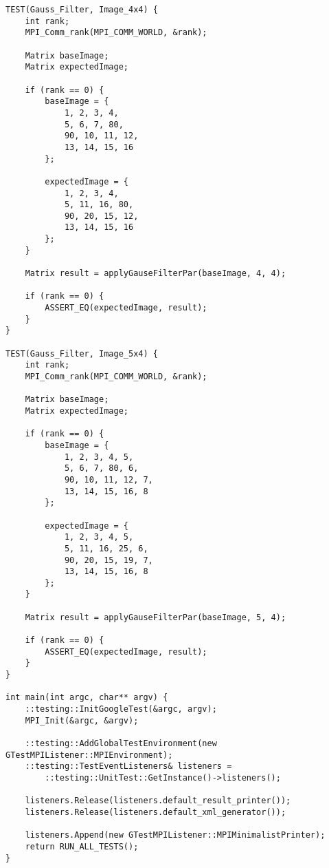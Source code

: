 \documentclass[12pt,a4paper]{article}
\begin{document}
\begin{lstlisting}
TEST(Gauss_Filter, Image_4x4) {
    int rank;
    MPI_Comm_rank(MPI_COMM_WORLD, &rank);

    Matrix baseImage;
    Matrix expectedImage;

    if (rank == 0) {
        baseImage = {
            1, 2, 3, 4,
            5, 6, 7, 80,
            90, 10, 11, 12,
            13, 14, 15, 16
        };

        expectedImage = {
            1, 2, 3, 4,
            5, 11, 16, 80,
            90, 20, 15, 12,
            13, 14, 15, 16
        };
    }

    Matrix result = applyGauseFilterPar(baseImage, 4, 4);

    if (rank == 0) {
        ASSERT_EQ(expectedImage, result);
    }
}

TEST(Gauss_Filter, Image_5x4) {
    int rank;
    MPI_Comm_rank(MPI_COMM_WORLD, &rank);

    Matrix baseImage;
    Matrix expectedImage;

    if (rank == 0) {
        baseImage = {
            1, 2, 3, 4, 5,
            5, 6, 7, 80, 6,
            90, 10, 11, 12, 7,
            13, 14, 15, 16, 8
        };

        expectedImage = {
            1, 2, 3, 4, 5,
            5, 11, 16, 25, 6,
            90, 20, 15, 19, 7,
            13, 14, 15, 16, 8
        };
    }

    Matrix result = applyGauseFilterPar(baseImage, 5, 4);

    if (rank == 0) {
        ASSERT_EQ(expectedImage, result);
    }
}

int main(int argc, char** argv) {
    ::testing::InitGoogleTest(&argc, argv);
    MPI_Init(&argc, &argv);

    ::testing::AddGlobalTestEnvironment(new GTestMPIListener::MPIEnvironment);
    ::testing::TestEventListeners& listeners =
        ::testing::UnitTest::GetInstance()->listeners();

    listeners.Release(listeners.default_result_printer());
    listeners.Release(listeners.default_xml_generator());

    listeners.Append(new GTestMPIListener::MPIMinimalistPrinter);
    return RUN_ALL_TESTS();
}
\end{lstlisting}
\end{document}
